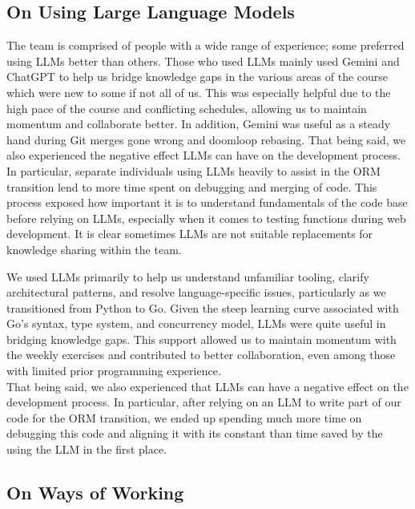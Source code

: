 \subsection{On Using Large Language Models}

The team is comprised of people with a wide range of experience; some preferred using LLMs better than others. Those who used LLMs mainly used Gemini and ChatGPT to help us bridge knowledge gaps in the various areas of the course which were new to some if not all of us. This was especially helpful due to the high pace of the course and conflicting schedules, allowing us to maintain momentum and collaborate better. In addition, Gemini was useful as a steady hand during Git merges gone wrong and doomloop rebasing. That being said, we also experienced the negative effect LLMs can have on the development process. In particular, separate individuals using LLMs heavily to assist in the ORM transition lend to more time spent on debugging and merging of code. This process exposed how important it is to understand fundamentals of the code base before relying on LLMs, especially when it comes to testing functions during web development. It is clear sometimes LLMs are not suitable replacements for knowledge sharing within the team. 





We used LLMs primarily to help us understand unfamiliar tooling, clarify architectural patterns, and resolve language-specific issues, particularly as we transitioned from Python to Go. Given the steep learning curve associated with Go’s syntax, type system, and concurrency model, LLMs were quite useful in bridging knowledge gaps. This support allowed us to maintain momentum with the weekly exercises and contributed to better collaboration, even among those with limited prior programming experience. \\
That being said, we also experienced that LLMs can have a negative effect on the development process. In particular, after relying on an LLM to write part of our code for the ORM transition, we ended up spending much more time on debugging this code and aligning it with its constant than time saved by the using the LLM in the first place.

\subsection{On Ways of Working}

